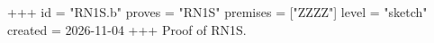 +++
id = "RN1S.b"
proves = "RN1S"
premises = ["ZZZZ"]
level = "sketch"
created = 2026-11-04
+++
Proof of RN1S.
